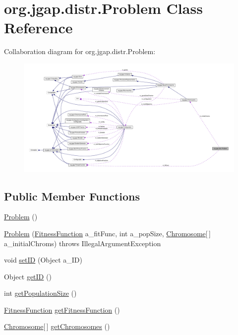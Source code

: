 \hypertarget{classorg_1_1jgap_1_1distr_1_1_problem}{\section{org.\-jgap.\-distr.\-Problem Class Reference}
\label{classorg_1_1jgap_1_1distr_1_1_problem}
}


Collaboration diagram for org.\-jgap.\-distr.\-Problem\-:
\nopagebreak
\begin{figure}[H]
\begin{center}
\leavevmode
\includegraphics[width=350pt]{classorg_1_1jgap_1_1distr_1_1_problem__coll__graph}
\end{center}
\end{figure}
\subsection*{Public Member Functions}
\begin{DoxyCompactItemize}
\item 
\hyperlink{classorg_1_1jgap_1_1distr_1_1_problem_a78e5d4f7c4400a87239a88f8f0d3206b}{Problem} ()
\item 
\hyperlink{classorg_1_1jgap_1_1distr_1_1_problem_a473e04894443b06401872ddd6f72dfb7}{Problem} (\hyperlink{classorg_1_1jgap_1_1_fitness_function}{Fitness\-Function} a\-\_\-fit\-Func, int a\-\_\-pop\-Size, \hyperlink{classorg_1_1jgap_1_1_chromosome}{Chromosome}\mbox{[}$\,$\mbox{]} a\-\_\-initial\-Chroms)  throws Illegal\-Argument\-Exception 
\item 
void \hyperlink{classorg_1_1jgap_1_1distr_1_1_problem_a8f67e200ff866a1410f6f8197511cedf}{set\-I\-D} (Object a\-\_\-\-I\-D)
\item 
Object \hyperlink{classorg_1_1jgap_1_1distr_1_1_problem_a8b9ed7347db5a4840638d5d631dfde8e}{get\-I\-D} ()
\item 
int \hyperlink{classorg_1_1jgap_1_1distr_1_1_problem_aca339743df3da86b755a008e9647831f}{get\-Population\-Size} ()
\item 
\hyperlink{classorg_1_1jgap_1_1_fitness_function}{Fitness\-Function} \hyperlink{classorg_1_1jgap_1_1distr_1_1_problem_a8748c7b742f43dc50cc04e9749e2edac}{get\-Fitness\-Function} ()
\item 
\hyperlink{classorg_1_1jgap_1_1_chromosome}{Chromosome}\mbox{[}$\,$\mbox{]} \hyperlink{classorg_1_1jgap_1_1distr_1_1_problem_a20ddaff662537bf4390300e1e63562a9}{get\-Chromosomes} ()
\end{DoxyCompactItemize}
